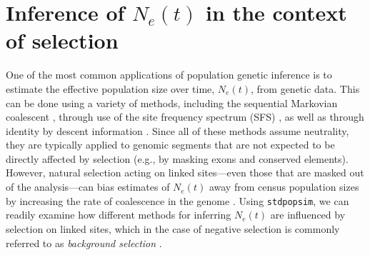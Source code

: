 \documentclass[hidelinks]{article}
\newcommand{\stdpopsim}{\texttt{stdpopsim}\xspace}
\newcommand{\drscomment}[1]{\textcolor{purple}{DRS: #1}}
\newcommand{\igcomment}[1]{\textcolor{orange}{IG: #1}}
\begin{document}
    \section*{Inference of $N_e(t)$ in the context of selection}
    One of the most common applications of population genetic inference is to estimate
    the effective population size over time, $N_e(t)$, from genetic data. This can be done
    using a variety of methods, including the sequential Markovian coalescent
    \citep{li2011inference,Schiffels2020,terhorst2017robust}, 
    through use of the site frequency spectrum (SFS) \citep{liu2020stairway},
    as well as through identity by descent information \citep{santiago2020recent}.
    Since all of these methods assume neutrality, they are typically applied to genomic
    segments that are not expected to be directly affected by selection (e.g., by masking exons
    and conserved elements).
    However, natural selection acting on linked sites---even those that are masked out of the
    analysis---can bias estimates of $N_e(t)$
    away from census population sizes by increasing the 
    rate of coalescence in the genome \citep[e.g.][]{schrider2016effects}. 
    Using \stdpopsim, we can readily examine how different methods for inferring $N_e(t)$
    are influenced by selection on linked sites,
    which in the case of negative selection is commonly referred to as \emph{background selection}
    \citep{charlesworth1993effect,hudson1995deleterious}.
\end{document}
